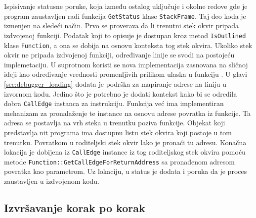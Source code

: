 \documentclass[12pt,oneside]{memoir}
\begin{document}
Ispisivanje statusne poruke, koja između ostalog uključuje i okolne redove gde je program zaustavljen radi funkcija \verb|GetStatus| klase \verb|StackFrame|.
Taj deo koda je izmenjen na sledeći način.
Prvo se proverava da li trenutni stek okvir pripada izdvojenoj funkciji.
Podatak koji to opisuje je dostupan kroz metod \verb|IsOutlined| klase \verb|Function|, a ona se dobija na osnovu konteksta tog stek okvira.
Ukoliko stek okvir ne pripada izdvojenoj funkciji, određivanje linije se svodi na postojeću implemetaciju.
U suprotnom koristi se nova implementacija zasnovana na sličnoj ideji kao određivanje vrednosti promenljivih prilikom ulaska u funkciju \cite{sowda2019entryvalues}.
U glavi \ref{sec:debugger_loading} dodata je podrška za mapiranje adrese na liniju u izvornom kodu.
Jedino što je potrebno je dodati kontekst kako bi se odredila dobra \verb|CallEdge| instanca za instrukciju.
Funkcija već ima implementiran mehanizam za pronalaženje te instance na osnovu adrese povratka iz funkcije.
Ta adresa se postavlja na vrh steka u trenutku poziva funkcije.
Objekat koji predstavlja nit programa ima dostupnu listu stek okvira koji postoje u tom trenutku.
Povratkom u roditeljski stek okvir lako je pronaći tu adresu.
Konačna lokacija je dobijena iz \verb|CallEdge| instance iz tog roditeljskog stek okvira pomoću metode \verb|Function::GetCallEdgeForReturnAddress| sa pronađenom adresom povratka kao parametrom.  
Uz lokaciju, u status je dodata i poruka da je proces zaustavljen u izdvojenom kodu.

\subsection{Izvršavanje korak po korak}

\label{sec:debugger_stepping}
\end{document}

